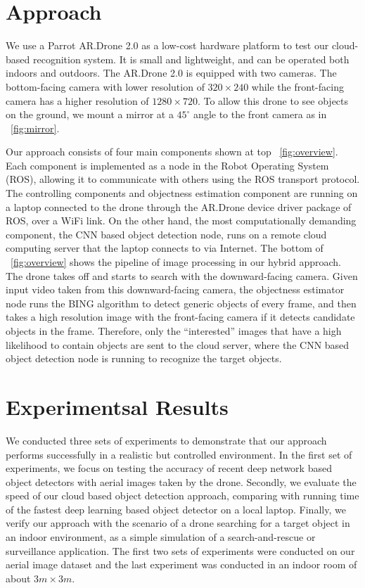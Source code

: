 \section{Approach}
We use a Parrot AR.Drone 2.0 as a low-cost hardware platform
to test our cloud-based recognition system. It is small and lightweight, and can be operated both indoors and outdoors.
The AR.Drone 2.0 is equipped with two cameras. 
The bottom-facing camera with lower resolution of $320 \times 240$ while the front-facing camera has a higher resolution of $1280 \times 720$. 
To allow this drone to see objects on the ground, we mount a mirror at a $45^{\circ}$ angle to the front camera as in ~\ref{fig:mirror}.

Our approach consists of four main components shown at top ~\ref{fig:overview}. Each component is implemented as a node in the Robot Operating System (ROS), allowing it to communicate with others using the ROS transport protocol.
The controlling components and objectness estimation component are running on a laptop connected to the drone through the AR.Drone device driver package of ROS, over a WiFi link. On the other hand, the most computationally demanding component, the CNN based object detection node, runs on a remote cloud computing server that the laptop connects to via Internet.
The bottom of ~\ref{fig:overview} shows the pipeline of image processing in our hybrid approach. 
The drone takes off and starts to search with the downward-facing camera. Given input video taken from this downward-facing camera, the objectness estimator node runs the BING algorithm to detect generic objects of every frame, and then takes a high resolution image with the front-facing camera if it detects candidate objects in the frame.
Therefore, only the ``interested'' images that have a high likelihood to contain objects are sent to the cloud server, where the CNN based object detection node is running to recognize the target objects.

\section{Experimentsal Results}
We conducted three sets of experiments to demonstrate that our approach performs successfully in a realistic but controlled environment. 
In the first set of experiments, we focus on testing the accuracy of recent deep network based object detectors with aerial images taken by the drone.
Secondly, we evaluate the speed of our cloud based object detection approach, comparing with running time of the fastest deep learning based object detector on a local laptop. Finally, we verify our approach with the scenario of a drone searching for a target object in an indoor environment, as a simple simulation of a search-and-rescue or surveillance application. 
The first two sets of experiments were conducted on our aerial image dataset and the last experiment was conducted in an indoor room of about $3m \times 3m$.

